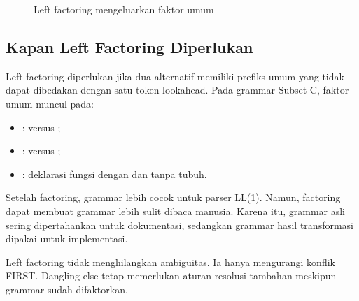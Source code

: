 \begin{figure}[H]
\centering
{}
\caption{Left factoring mengeluarkan faktor umum}
\label{fig:ch09-left-factoring}
\end{figure}

\subsection{Kapan Left Factoring Diperlukan}

Left factoring diperlukan jika dua alternatif memiliki prefiks umum
yang tidak dapat dibedakan dengan satu token lookahead. Pada grammar
Subset-C, faktor umum muncul pada:
\begin{itemize}[leftmargin=*]
  \item {}:  versus ;
  \item {}:  versus ;
  \item {}: deklarasi fungsi dengan dan tanpa tubuh.
\end{itemize}

Setelah factoring, grammar lebih cocok untuk parser LL(1). Namun,
factoring dapat membuat grammar lebih sulit dibaca manusia. Karena
itu, grammar asli sering dipertahankan untuk dokumentasi, sedangkan
grammar hasil transformasi dipakai untuk implementasi.

\begin{warningbox}
Left factoring tidak menghilangkan ambiguitas. Ia hanya mengurangi
konflik FIRST. Dangling else tetap memerlukan aturan resolusi
tambahan meskipun grammar sudah difaktorkan.
\end{warningbox}
